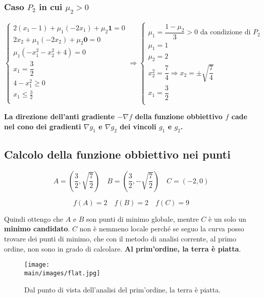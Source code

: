 \documentclass[\main/main.tex]{subfiles}
\begin{document}
\subsubsection{Caso $P_2$ in cui $\mu_2 > 0$}
\[
\begin{cases}
	2(x_1-1) + \mu_1 (-2x_1) + \mu_2 \bm{1} = 0	\\
	2x_2 + \mu_1 (-2x_2) + \mu_2  \bm{0} = 0\\
	\mu_1 (-x_1^2 - x_2^2 + 4)= 0\\
	x_1= \dfrac{3}{2}\\
	4-x_1^2 \geq 0  \\
	x_1 \leq \frac{3}{2}\\
\end{cases}
\Rightarrow
\begin{cases}
	\mu_1 = \dfrac{1-\mu_2}{3} > 0 \text{ da condizione di $P_2$}	\\
	\mu_1 = 1 \\
	\mu_2 = 2 \\
	x_2^2 = \dfrac{7}{4} \Rightarrow x_2 = \pm \sqrt{ \dfrac{7}{4}} \\
	x_1= \dfrac{3}{2}\\
\end{cases}
\]

\textbf{La direzione dell'anti gradiente $-\nabla f$ della funzione obbiettivo $f$ cade nel cono dei gradienti  $\nabla g_1$ e $\nabla g_2$ dei vincoli $g_1$ e $g_2$.}

\subsection{Calcolo della funzione obbiettivo nei punti}

\[
	A = (\dfrac{3}{2}, \sqrt{\dfrac{7}{2}}) \quad B = (\dfrac{3}{2}, -\sqrt{\dfrac{7}{2}})  \quad C = (-2, 0)
\]

\[
	f(A) = 2 \quad f(B) = 2 \quad f(C) = 9
\]

Quindi ottengo che $A$ e $B$ son punti di minimo globale, mentre $C$ è un solo un \textbf{minimo candidato}. $C$ non è nemmeno locale perché se seguo la curva posso trovare dei punti di minimo, che con il metodo di analisi corrente, al primo ordine, non sono in grado di calcolare. \textbf{Al prim'ordine, la terra è piatta}.

\begin{figure}[H]
\center
\texttt{[image: \\main/images/flat.jpg]}
\caption{Dal punto di vista dell'analisi del prim'ordine, la terra è piatta.}
\end{figure}
\end{document}
